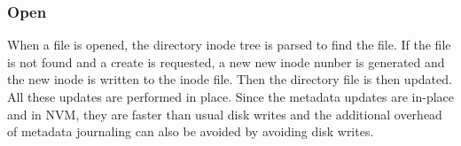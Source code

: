 \subsubsection{Open}
When a file is opened, the directory inode tree is parsed to find the file. If the file is not found and a create is requested, a new new inode nunber is generated and the new inode is written to the inode file. Then the directory file is then updated. All these updates are performed in place. Since the metadata updates are in-place and in NVM, they are faster than usual disk writes and the additional overhead of metadata journaling can also be avoided by avoiding disk writes.
